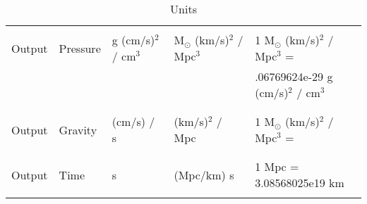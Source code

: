 \begin{table*}[h]
\begin{scriptsize}
\begin{center}
\begin{tabular}{|l|l|l|l|l|}
          & & & & \\ \hline 
          & & & & \\
Output            & Pressure                                        &  g (cm/s)$^2$ / cm$^3$
                                                                    &  M$_\odot$ (km/s)$^2$ / Mpc$^3$
                                                                    & 1 M$_\odot$ (km/s)$^2$ / Mpc$^3$ =  \\
                                                           &  &  &  &  .06769624e-29 g (cm/s)$^2$ / cm$^3$ \\
          & & & & \\ \hline 
          & & & & \\
Output            & Gravity                                         &  (cm/s) / s
                                                                    &  (km/s)$^2$ / Mpc
                                                                    & 1 M$_\odot$ (km/s)$^2$ / Mpc$^3$ =  \\
          & & & & \\ \hline 
          & & & & \\
Output            & Time                                            &  s
                                                                    &  (Mpc/km) s 
                                                                    &  1 Mpc = 3.08568025e19 km \\
          & & & & \\ \hline 
\end{tabular}
\label{Table:Units}
\caption{Units}
\end{center}
\end{scriptsize}
\end{table*}

\newpage

